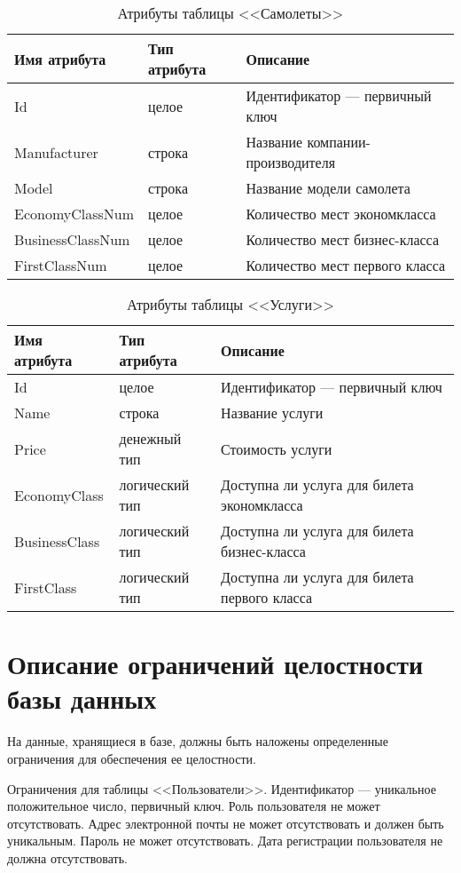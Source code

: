\documentclass{bmstu}
\begin{document}
\begin{table}[H]
\caption{Атрибуты таблицы <<Самолеты>>}
\label{tabular:planes}
\begin{tabular}{|>{\raggedleft}p{4cm}|>{\raggedleft}p{3cm}|>{\raggedleft}p{8cm}|}
\hline
\textbf{Имя атрибута} & \textbf{Тип атрибута} & \textbf{Описание}
\tabularnewline
\hline
Id & целое & Идентификатор --- первичный ключ
\tabularnewline
\hline
Manufacturer & строка & Название компании-производителя
\tabularnewline
\hline
Model & строка & Название модели самолета
\tabularnewline
\hline
EconomyClassNum & целое & Количество мест экономкласса
\tabularnewline
\hline
BusinessClassNum & целое & Количество мест бизнес-класса
\tabularnewline
\hline
FirstClassNum & целое & Количество мест первого класса
\tabularnewline
\hline
\end{tabular}
\end{table}

\begin{table}[H]
\caption{Атрибуты таблицы <<Услуги>>}
\label{tabular:services}
\begin{tabular}{|>{\raggedleft}p{4cm}|>{\raggedleft}p{3cm}|>{\raggedleft}p{8cm}|}
\hline
\textbf{Имя атрибута} & \textbf{Тип атрибута} & \textbf{Описание}
\tabularnewline
\hline
Id & целое & Идентификатор --- первичный ключ
\tabularnewline
\hline
Name & строка & Название услуги
\tabularnewline
\hline
Price & денежный тип & Стоимость услуги
\tabularnewline
\hline
EconomyClass & логический тип & Доступна ли услуга для билета экономкласса
\tabularnewline
\hline
BusinessClass & логический тип & Доступна ли услуга для билета бизнес-класса
\tabularnewline
\hline
FirstClass & логический тип & Доступна ли услуга для билета первого класса
\tabularnewline
\hline
\end{tabular}
\end{table}

\section{Описание ограничений целостности базы данных}

На данные, хранящиеся в базе, должны быть наложены определенные ограничения для обеспечения ее целостности.

Ограничения для таблицы <<Пользователи>>. 
Идентификатор --- уникальное положительное число, первичный ключ. 
Роль пользователя не может отсутствовать.
Адрес электронной почты не может отсутствовать и должен быть уникальным. 
Пароль не может отсутствовать. 
Дата регистрации пользователя не должна отсутствовать.
\end{document}
